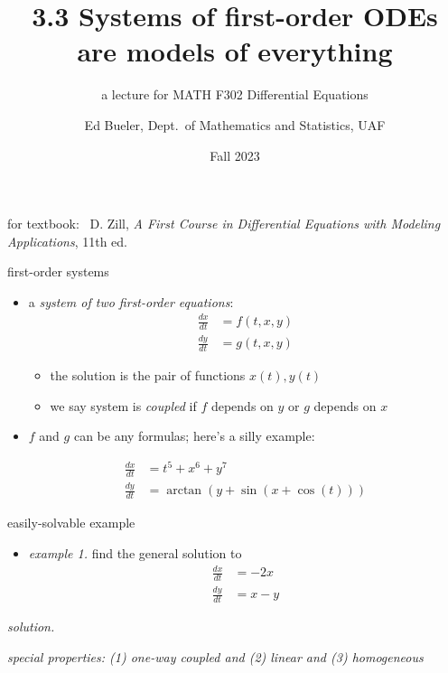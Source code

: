 \documentclass[dvipsnames,colorlinks]{beamer}
\title{3.3 Systems of first-order ODEs \\ are models of everything}
\subtitle{a lecture for MATH F302 Differential Equations}
\author{Ed Bueler, Dept.~of Mathematics and Statistics, UAF}
\date{Fall 2023}
\begin{document}


\begin{frame}
\titlepage

\centerline{\tiny for textbook: \, D. Zill, \emph{A First Course in Differential Equations with Modeling Applications}, 11th ed.}
\end{frame}


\begin{frame}{first-order systems}

\begin{itemize}
\item a \emph{system of two first-order equations}:
\begin{align*}
\frac{dx}{dt} &= f(t,x,y) \\
\frac{dy}{dt} &= g(t,x,y)
\end{align*}

\vspace{-2mm}
    \begin{itemize}
    \item the solution is the pair of functions $x(t),y(t)$
    \item we say system is \emph{coupled} if $f$ depends on $y$ or $g$ depends on $x$
    \end{itemize}

\item $f$ and $g$ can be any formulas; here's a silly example:

\vspace{-3mm}
\scriptsize
\begin{align*}
\frac{dx}{dt} &= t^5 + x^6 + y^7 \\
\frac{dy}{dt} &= \arctan(y + \sin(x + \cos(t)))
\end{align*}
\normalsize
\end{itemize}
\end{frame}


\begin{frame}{easily-solvable example}

\begin{itemize}
\item \emph{example 1.}  find the general solution to
\begin{align*}
\frac{dx}{dt} &= - 2 x\\
\frac{dy}{dt} &= x - y
\end{align*}
\end{itemize}

\noindent \emph{solution.}

\vspace{45mm}
\hfill \tiny \emph{special properties: (1) one-way coupled and (2) linear and (3) homogeneous}
\end{frame}
\end{document}

